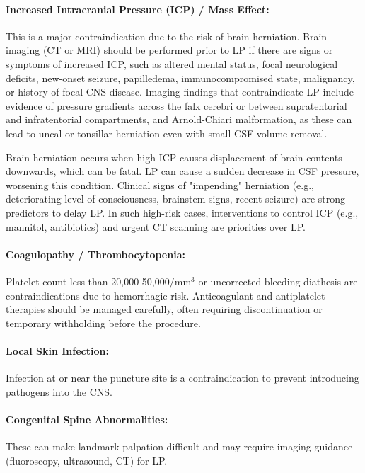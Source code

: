 \paragraph{Increased Intracranial Pressure (ICP) / Mass Effect:} This is a major contraindication due to the risk of brain herniation. Brain imaging (CT or MRI) should be performed prior to LP if there are signs or symptoms of increased ICP, such as altered mental status, focal neurological deficits, new-onset seizure, papilledema, immunocompromised state, malignancy, or history of focal CNS disease. Imaging findings that contraindicate LP include evidence of pressure gradients across the falx cerebri or between supratentorial and infratentorial compartments, and Arnold-Chiari malformation, as these can lead to uncal or tonsillar herniation even with small CSF volume removal.
	
Brain herniation occurs when high ICP causes displacement of brain contents downwards, which can be fatal. LP can cause a sudden decrease in CSF pressure, worsening this condition. Clinical signs of "impending" herniation (e.g., deteriorating level of consciousness, brainstem signs, recent seizure) are strong predictors to delay LP. In such high-risk cases, interventions to control ICP (e.g., mannitol, antibiotics) and urgent CT scanning are priorities over LP.
	
\paragraph{Coagulopathy / Thrombocytopenia:} Platelet count less than 20,000-50,000/mm$^3$ or uncorrected bleeding diathesis are contraindications due to hemorrhagic risk. Anticoagulant and antiplatelet therapies should be managed carefully, often requiring discontinuation or temporary withholding before the procedure.
	
\paragraph{Local Skin Infection:} Infection at or near the puncture site is a contraindication to prevent introducing pathogens into the CNS.
	
\paragraph{Congenital Spine Abnormalities:} These can make landmark palpation difficult and may require imaging guidance (fluoroscopy, ultrasound, CT) for LP.
	
